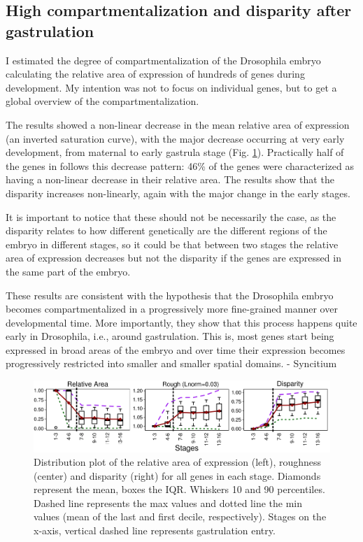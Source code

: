 \subsection{High compartmentalization and disparity after gastrulation}
I estimated the degree of compartmentalization of the Drosophila embryo calculating the relative area of expression of hundreds of genes during development.
My intention was not to focus on individual genes, but to get a global overview of the compartmentalization.

The results showed a non-linear decrease in the mean relative area of expression (an inverted saturation curve), with the major decrease occurring at very early development, from maternal to early gastrula stage (Fig. \ref{fig:Art-I-3measures}).
Practically half of the genes in follows this decrease pattern: 46\% of the genes were characterized as having a non-linear decrease in their relative area.
The results show that the disparity increases non-linearly, again with the major change in the early stages.

It is important to notice that these should not be necessarily the case, as the disparity relates to how different genetically are the different regions of the embryo in different stages, so it could be that between two stages the relative area of expression decreases but not the disparity if the genes are expressed in the same part of the embryo.


These results are consistent with the hypothesis that the Drosophila embryo becomes compartmentalized in a progressively more fine-grained manner over developmental time. 
More importantly, they show that this process happens quite early in Drosophila, i.e., around gastrulation.
This is, most genes start being expressed in broad areas of the embryo and over time their expression becomes progressively restricted into smaller and smaller spatial domains.
- Syncitium

\begin{figure}[h]
  \includegraphics[width=\textwidth]{./Images/Art-I/3_measures.png}
  \centering
  \caption{Distribution plot of the relative area of expression (left), roughness (center) and disparity (right) for all genes in each stage. Diamonds represent the mean, boxes the IQR. Whiskers 10 and 90 percentiles. Dashed line represents the max values and dotted line the min values (mean of the last and first decile, respectively). Stages on the x-axis, vertical dashed line represents gastrulation entry.}
  \label{fig:Art-I-3measures}
\end{figure}

